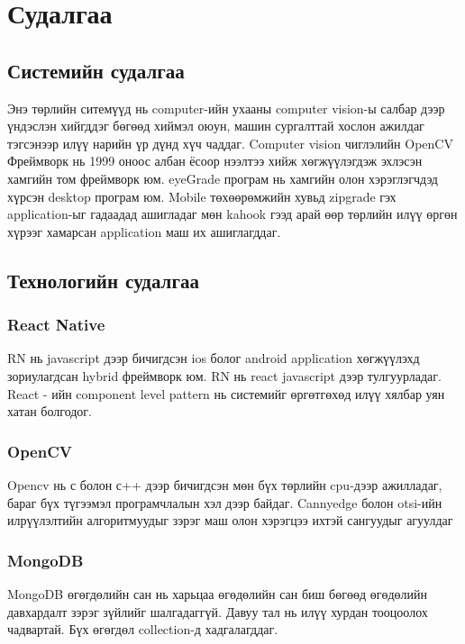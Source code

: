 


\newcommand{\keyword}[1]{\textbf{#1}}
\newcommand{\tabhead}[1]{\textbf{#1}}
\newcommand{\code}[1]{\texttt{#1}}
\newcommand{\file}[1]{\texttt{\bfseries#1}}
\newcommand{\option}[1]{\texttt{\itshape#1}}

\section{Судалгаа}	
\subsection{Системийн судалгаа}
	Энэ төрлийн ситемүүд нь computer-ийн ухааны computer vision-ы салбар дээр үндэслэн хийгддэг бөгөөд хиймэл оюун, машин сургалттай хослон ажилдаг тэгсэнээр илүү нарийн үр дүнд хүч чаддаг. Computer vision чиглэлийн OpenCV Фреймворк нь 1999 оноос албан ёсоор нээлтээ хийж хөгжүүлэгдэж эхлэсэн хамгийн том фреймворк юм. eyeGrade програм нь хамгийн олон хэрэглэгчдэд хүрсэн desktop програм юм. Mobile төхөөрөмжийн хувьд zipgrade гэх application-ыг гадаадад ашигладаг мөн kahook гээд арай өөр төрлийн илүү өргөн хүрээг хамарсан application маш их ашиглагддаг.
\subsection{Технологийн судалгаа}
	\subsubsection{React Native}
	RN нь javascript дээр бичигдсэн ios болог android application хөгжүүлэхд зориулагдсан hybrid фреймворк юм. RN нь react javascript дээр тулгуурладаг. React - ийн component level pattern нь системийг өргөтгөхөд илүү хялбар уян хатан болгодог.
	\subsubsection{OpenCV}
	Opencv нь с болон с++  дээр бичигдсэн мөн бүх төрлийн cpu-дээр ажилладаг, бараг бүх түгээмэл програмчлалын хэл дээр байдаг. Cannyedge болон otsi-ийн илрүүлэлтийн алгоритмуудыг зэрэг маш олон хэрэгцээ ихтэй сангуудыг агуулдаг
	\subsubsection{MongoDB}
	MongoDB өгөгдөлийн сан нь харьцаа өгөдөлийн сан биш бөгөөд өгөдөлийн давхардалт зэрэг зүйлийг шалгадаггүй. Давуу тал нь илүү хурдан тооцоолох чадвартай. Бүх өгөгдөл collection-д хадгалагддаг.
